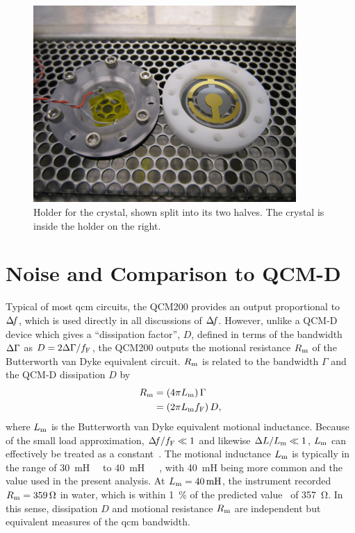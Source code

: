 \begin{figure}[ht]
  \centering
  \includegraphics[width=10cm,keepaspectratio]{qcm/figures/qcm_holderdiss.jpg}
  \caption{Holder for the crystal, shown split into its two halves.  The
    crystal is inside the holder on the right.}
  \label{fig:cfqcmholder}
\end{figure}

\section{Noise and Comparison to QCM-D}\label{sec:suppqcmdcomp}
Typical of most \gls{qcm} circuits, the QCM200 provides an output proportional to
$\Delta\!f$, which is used directly in all discussions of $\Delta\!f$.  However, unlike
a QCM-D device which gives a ``dissipation factor'', $D$, defined in
terms of the bandwidth $\Delta\Gamma$ as $D=2\Delta\Gamma/f_\mathrm{F}$, the QCM200
outputs the motional resistance $R_\mathrm{m}$ of the Butterworth van Dyke
equivalent circuit.  $R_\mathrm{m}$ is related to
the bandwidth $\Gamma$ and the QCM-D dissipation $D$ by
\begin{align}
  R_\mathrm{m} & =\left(4 \pi L_\mathrm{m}\right) \Gamma          \\
      & =\left(2 \pi L_\mathrm{m} f_\mathrm{F}\right) D,
\end{align}
where $L_\mathrm{m}$ is the Butterworth van Dyke equivalent motional inductance.
Because of the small load approximation, $\Delta\!f/f_\mathrm{F} \ll 1$ and
likewise $\Delta L/L_\mathrm{m} \ll 1$, $L_\mathrm{m}$ can effectively be treated as a
constant~\cite{geelhood2002transient}.  The motional inductance $L_\mathrm{m}$ is
typically in the range of
\SI{30}{\milli\henry}~\cite{srsqcm200manual}~\cite{hussain2005ots} to
\SI{40}{\milli\henry}~\cite{gottschling2000detection}~\cite{arnau2002circuit}~\cite{snellings2001response},
with \SI{40}{\milli\henry} being more common and the value used in the
present analysis.  At $\Lm=\SI{40}{\milli\henry}$, the instrument recorded
$R_\mathrm{m}=\SI{359}{\ohm}$ in water, which is within \SI{1}{\percent} of the
predicted value~\cite{kanazawa1985frequency} of \SI{357}{\ohm}.  In this
sense, dissipation $D$ and motional resistance $R_\mathrm{m}$ are independent but
equivalent measures of the \gls{qcm} bandwidth.

